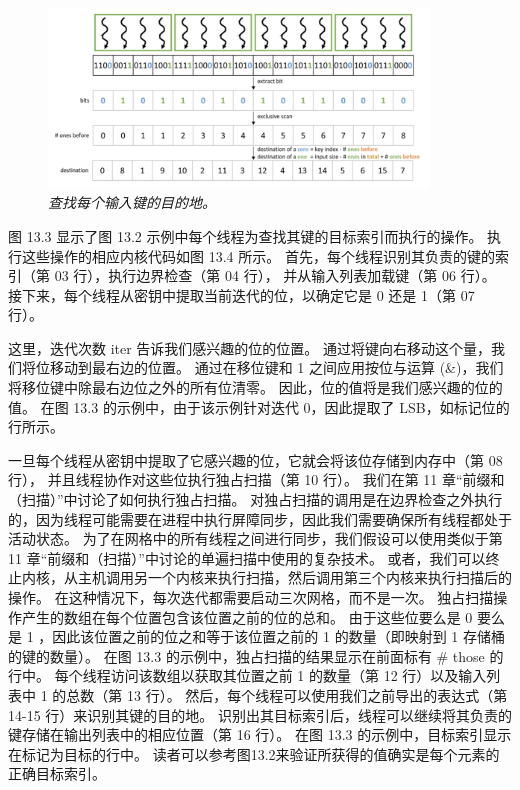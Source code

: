 \begin{figure}[H]
	\centering
	\includegraphics[width=0.9\textwidth]{figs/F13.3.png}
	\caption{\textit{查找每个输入键的目的地。}}
\end{figure}

图 13.3 显示了图 13.2 示例中每个线程为查找其键的目标索引而执行的操作。 
执行这些操作的相应内核代码如图 13.4 所示。 首先，每个线程识别其负责的键的索引（第 03 行），执行边界检查（第 04 行），
并从输入列表加载键（第 06 行）。 接下来，每个线程从密钥中提取当前迭代的位，以确定它是 0 还是 1（第 07 行）。

这里，迭代次数 iter 告诉我们感兴趣的位的位置。 通过将键向右移动这个量，我们将位移动到最右边的位置。 
通过在移位键和 1 之间应用按位与运算 (\&)，我们将移位键中除最右边位之外的所有位清零。 
因此，位的值将是我们感兴趣的位的值。 在图 13.3 的示例中，由于该示例针对迭代 0，因此提取了 LSB，如标记位的行所示。

一旦每个线程从密钥中提取了它感兴趣的位，它就会将该位存储到内存中（第 08 行），
并且线程协作对这些位执行独占扫描（第 10 行）。 我们在第 11 章“前缀和（扫描）”中讨论了如何执行独占扫描。 
对独占扫描的调用是在边界检查之外执行的，因为线程可能需要在进程中执行屏障同步，因此我们需要确保所有线程都处于活动状态。 
为了在网格中的所有线程之间进行同步，我们假设可以使用类似于第 11 章“前缀和（扫描）”中讨论的单遍扫描中使用的复杂技术。 
或者，我们可以终止内核，从主机调用另一个内核来执行扫描，然后调用第三个内核来执行扫描后的操作。 
在这种情况下，每次迭代都需要启动三次网格，而不是一次。 独占扫描操作产生的数组在每个位置包含该位置之前的位的总和。 
由于这些位要么是 0 要么是 1 ，因此该位置之前的位之和等于该位置之前的 1 的数量（即映射到 1 存储桶的键的数量）。 
在图 13.3 的示例中，独占扫描的结果显示在前面标有 \# those 的行中。 
每个线程访问该数组以获取其位置之前 1 的数量（第 12 行）以及输入列表中 1 的总数（第 13 行）。 
然后，每个线程可以使用我们之前导出的表达式（第 14-15 行）来识别其键的目的地。 
识别出其目标索引后，线程可以继续将其负责的键存储在输出列表中的相应位置（第 16 行）。 
在图 13.3 的示例中，目标索引显示在标记为目标的行中。 读者可以参考图13.2来验证所获得的值确实是每个元素的正确目标索引。

